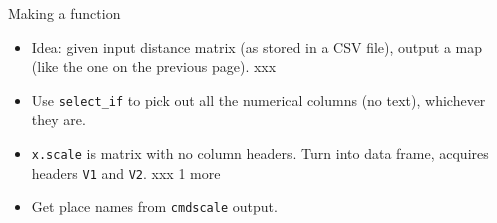 \documentclass[ignorenonframetext,]{beamer}
\newenvironment{Shaded}{\begin{snugshade}}{\end{snugshade}}
\newcommand{\CommentTok}[1]{\textcolor[rgb]{0.56,0.35,0.01}{\textit{#1}}}
\newcommand{\ControlFlowTok}[1]{\textcolor[rgb]{0.13,0.29,0.53}{\textbf{#1}}}
\newcommand{\DataTypeTok}[1]{\textcolor[rgb]{0.13,0.29,0.53}{#1}}
\newcommand{\KeywordTok}[1]{\textcolor[rgb]{0.13,0.29,0.53}{\textbf{#1}}}
\newcommand{\NormalTok}[1]{#1}
\newcommand{\OperatorTok}[1]{\textcolor[rgb]{0.81,0.36,0.00}{\textbf{#1}}}
\newcommand{\StringTok}[1]{\textcolor[rgb]{0.31,0.60,0.02}{#1}}
\providecommand{\tightlist}{%
  \setlength{\itemsep}{0pt}\setlength{\parskip}{0pt}}
\begin{document}
\begin{frame}[fragile]{Making a function}
\protect\hypertarget{making-a-function}{}

\begin{itemize}
\tightlist
\item
  Idea: given input distance matrix (as stored in a CSV file), output a
  map (like the one on the previous page). xxx
\end{itemize}

\scriptsize

\begin{Shaded}
\end{Shaded}

\normalsize

\small

\begin{itemize}
\item
  Use \texttt{select\_if} to pick out all the numerical columns (no
  text), whichever they are.
\item
  \texttt{x.scale} is matrix with no column headers. Turn into data
  frame, acquires headers \texttt{V1} and \texttt{V2}. xxx 1 more
\item
  Get place names from \texttt{cmdscale} output. \normalsize
\end{itemize}

\end{frame}
\end{document}
